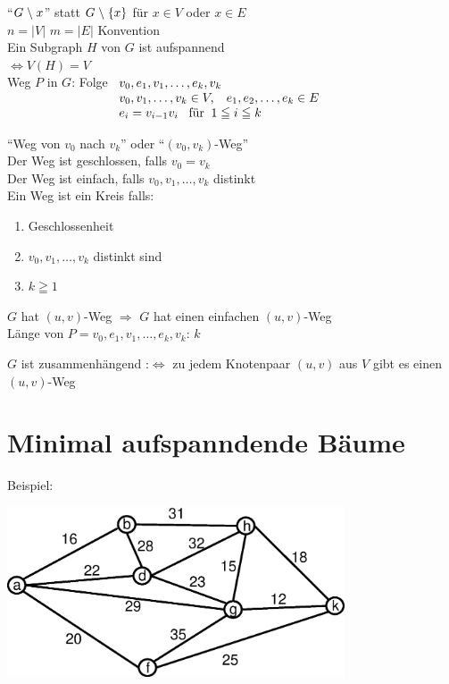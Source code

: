 "`$G \;\backslash\; x$"' statt $G \;\backslash\; \{x\}$ für $x \in V$ oder $x \in
E$\\

$n=|V|$ \hspace{4mm} $m = |E|$ \hspace{4mm} Konvention\\

Ein Subgraph $H$ von $G$ ist aufspannend\\
$\Leftrightarrow V (H) = V$\\

Weg $P$ in $G$: Folge $\begin{array}[t]{l}
v_{0}, e_{1}, v_{1}, \ldots, e_{k}, v_{k}\\
v_{0}, v_{1}, \ldots, v_{k} \in V, \hspace{3mm} e_{1}, e_{2}, \ldots, e_{k}
\in E\\
e_{i} = v_{i-1} v_{i} \; \; \; \mbox{für}\; \;  1 \leqq i \leqq k
\end{array}$

"`Weg von $v_{0}$ nach $v_{k}$"' oder "`$(v_{0}, v_{k})$-Weg"'\\
Der Weg ist geschlossen, falls $v_{0} = v_{k}$\\
Der Weg ist einfach, falls $v_{0}, v_{1}, \ldots, v_{k}$ distinkt\\
Ein Weg ist ein Kreis falls:
\begin{enumerate}
\item Geschlossenheit
\item $v_{0}, v_{1}, \ldots, v_{k}$ distinkt sind
\item $k \geqq 1$
\end{enumerate}

$G$ hat $(u,v)$-Weg $\Rightarrow$ $G$ hat einen einfachen $(u,v)$-Weg\\
Länge von $P= v_{0}, e_{1}, v_{1}, \ldots, e_{k}, v_{k}$: $k$

$G$ ist zusammenhängend :$\Leftrightarrow$ zu jedem Knotenpaar $(u,v)$ aus $V$
gibt es einen $(u,v)$-Weg

\section{Minimal aufspanndende Bäume} 

Beispiel:


\includegraphics[width=10cm]{bilder/2-1NetzwerkP}

